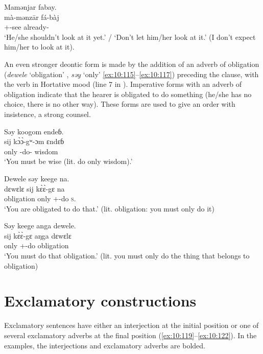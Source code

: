 \ea \label{ex:10:114}
Mamənjar  fabay. \\
\gll  mà-mənz\={a}r     fá-bàj\\
      {\twoS}+{\HOR}-see    already-{\NEG}\\
\glt  ‘He/she shouldn’t look at it yet.’ / ‘Don’t let him/her look at it.’ (I don’t expect him/her to look at it).
\z 

An even stronger deontic form is made by the addition of an adverb of obligation (\textit{dewele} ‘obligation’ , \textit{səy} ‘only’ \ref{ex:10:115}–\ref{ex:10:117}) preceding the clause, with the verb in Hortative mood (line 7 in ). Imperative forms with an adverb of obligation indicate that the hearer is obligated to do something (he/she has no choice, there is no other way). These forms are used to give an order with insistence, a strong counsel.

\ea \label{ex:10:115}
Səy  koogom  endeɓ.\\
\gll  sij     k\`{ɔ}\`{ɔ}-gʷ-ɔm   ɛndɛɓ\\
      only    {\twoP}-do-{\twoP}   wisdom\\
\glt  ‘You must be wise (lit. do only wisdom).’
\z 

\ea \label{ex:10:116}
Dewele  səy  keege  na.\\
\gll  dɛwɛlɛ   sij   k\`{ɛ}\`{ɛ}-gɛ     na\\
      obligation  only   {\twoS}+{\HOR}-do   \textsc{s}.{\DO}\\
\glt  ‘You are obligated to do that.’ (lit. obligation: you must only do it)
\z 

\ea \label{ex:10:117}
Səy  keege  anga  dewele.\\
\gll  sij     k\`{ɛ}\`{ɛ}-gɛ     aŋga   dɛwɛlɛ\\
      only   {\twoS}+{\HOR}-do   {\POSS}   obligation\\
\glt  ‘You must do that obligation.’ (lit. you must only do the thing that belongs to obligation)
\z 

\section{Exclamatory constructions}\label{sec:10.5}
\hypertarget{RefHeading1213121525720847}{}
Exclamatory sentences have either an interjection at the initial position  or one of several exclamatory adverbs at the final position (\ref{ex:10:119}–\ref{ex:10:122}). In the examples, the interjections and exclamatory adverbs are bolded. 

